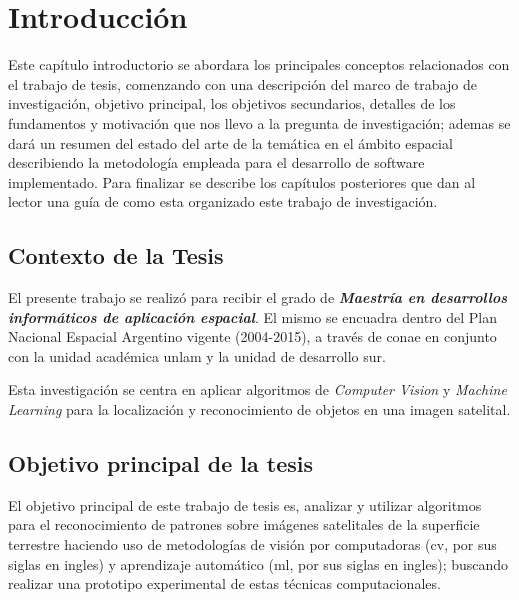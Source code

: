 \chapter{Introducción}\label{chap:introduccion}

Este capítulo introductorio se abordara los principales conceptos relacionados con el trabajo de tesis, comenzando con una descripción del marco de trabajo de investigación, objetivo principal, los objetivos secundarios, detalles de los fundamentos y motivación que nos llevo a la pregunta de investigación; ademas se dará un resumen del estado del arte de la temática en el ámbito espacial describiendo la metodología empleada para el desarrollo de software implementado. Para finalizar se describe los capítulos posteriores que dan al lector una guía de como esta organizado este trabajo de investigación.


\section{Contexto de la Tesis}\label{sec:contexto}
El presente trabajo se realizó para recibir el grado de\textbf{ \textit{Maestría en desarrollos informáticos de aplicación espacial}}. El mismo se encuadra dentro del Plan Nacional Espacial Argentino vigente (2004-2015), a través de \ac{conae} en conjunto con la unidad académica \ac{unlam} y la unidad de desarrollo \ac{sur}.

Esta investigación se centra en aplicar  algoritmos de \textit{Computer Vision}  y \textit{Machine Learning} para la localización y reconocimiento de objetos en una imagen satelital.


\section{Objetivo principal de la tesis}\label{sec:ObjGral}

El objetivo principal de este trabajo de tesis es, analizar y utilizar algoritmos para el  reconocimiento de patrones sobre imágenes satelitales de la superficie terrestre haciendo uso de metodologías de visión por computadoras (\ac{cv}, por sus siglas en ingles) y aprendizaje automático (\ac{ml}, por sus siglas en ingles); buscando realizar una prototipo experimental de estas técnicas computacionales.


